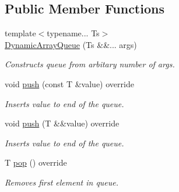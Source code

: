 \subsection*{Public Member Functions}
\begin{DoxyCompactItemize}
\item 
{\footnotesize template$<$typename... Ts$>$ }\\\hyperlink{classlab_1_1impl_1_1DynamicArrayQueue_a1c39ec156dd583bb102839d7b4eec5d6}{Dynamic\+Array\+Queue} (Ts \&\&... args)
\begin{DoxyCompactList}\small\item\em Constructs queue from arbitary number of args. \end{DoxyCompactList}\item 
\mbox{\label{classlab_1_1impl_1_1DynamicArrayQueue_ad9efa241a1b44bcab089614fecfbd27b}} 
void \hyperlink{classlab_1_1impl_1_1DynamicArrayQueue_ad9efa241a1b44bcab089614fecfbd27b}{push} (const T \&value) override
\begin{DoxyCompactList}\small\item\em Inserts value to end of the queue. \end{DoxyCompactList}\item 
\mbox{\label{classlab_1_1impl_1_1DynamicArrayQueue_a1ce4ca0bca46d2228c063aa22e031bff}} 
void \hyperlink{classlab_1_1impl_1_1DynamicArrayQueue_a1ce4ca0bca46d2228c063aa22e031bff}{push} (T \&\&value) override
\begin{DoxyCompactList}\small\item\em Inserts value to end of the queue. \end{DoxyCompactList}\item 
\mbox{\label{classlab_1_1impl_1_1DynamicArrayQueue_a5263af315b723598977cbe48395e624c}} 
T \hyperlink{classlab_1_1impl_1_1DynamicArrayQueue_a5263af315b723598977cbe48395e624c}{pop} () override
\begin{DoxyCompactList}\small\item\em Removes first element in queue. \end{DoxyCompactList}\item 
\mbox{\label{classlab_1_1impl_1_1DynamicArrayQueue_a1b944916c9b3a1b2c96a21e76e3aa4f0}} 

\end{DoxyCompactItemize}
